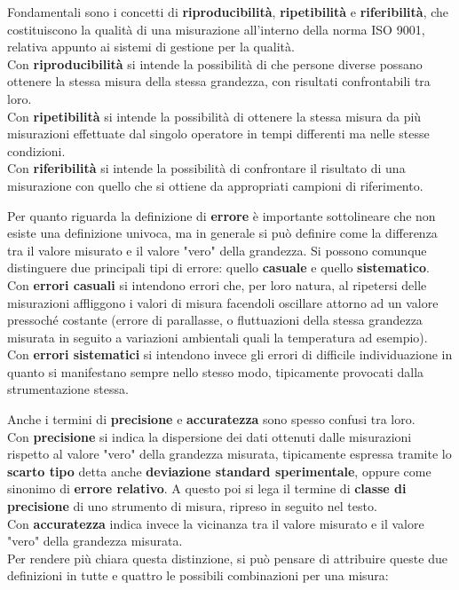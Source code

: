 \documentclass[a4paper, twoside]{article}
\begin{document}
Fondamentali sono i concetti di \textbf{riproducibilità}, \textbf{ripetibilità} e \textbf{riferibilità}, che costituiscono la qualità di una misurazione all'interno della norma ISO 9001, relativa appunto ai sistemi di gestione per la qualità.\\
Con \textbf{riproducibilità} si intende la possibilità di che persone diverse possano ottenere la stessa misura della stessa grandezza, con risultati confrontabili tra loro.\\
Con \textbf{ripetibilità} si intende la possibilità di ottenere la stessa misura da più misurazioni effettuate dal singolo operatore in tempi differenti ma nelle stesse condizioni.\\
Con \textbf{riferibilità} si intende la possibilità di confrontare il risultato di una misurazione con quello che si ottiene da appropriati campioni di riferimento.\par 

Per quanto riguarda la definizione di \textbf{errore} è importante sottolineare che non esiste una definizione univoca, ma in generale si può definire come la differenza tra il valore misurato e il valore "vero" della grandezza. Si possono comunque distinguere due principali tipi di errore: quello \textbf{casuale} e quello \textbf{sistematico}.\\
Con \textbf{errori casuali} si intendono errori che, per loro natura, al ripetersi delle misurazioni affliggono i valori di misura facendoli oscillare attorno ad un valore pressoché costante (errore di parallasse, o fluttuazioni della stessa grandezza misurata in seguito a variazioni ambientali quali la temperatura ad esempio).\\
Con \textbf{errori sistematici} si intendono invece gli errori di difficile individuazione in quanto si manifestano sempre nello stesso modo, tipicamente provocati dalla strumentazione stessa. \par

Anche i termini di \textbf{precisione} e \textbf{accuratezza} sono spesso confusi tra loro.\\
Con \textbf{precisione} si indica la dispersione dei dati ottenuti dalle misurazioni rispetto al valore "vero" della grandezza misurata, tipicamente espressa tramite  lo \textbf{scarto tipo} detta anche \textbf{deviazione standard sperimentale}, oppure come sinonimo di \textbf{errore relativo}. A questo poi si lega il termine di \textbf{classe di precisione} di uno strumento di misura, ripreso in seguito nel testo.\\
Con \textbf{accuratezza} indica invece la vicinanza tra il valore misurato e il valore "vero" della grandezza misurata.\\
Per rendere più chiara questa distinzione, si può pensare di attribuire queste due definizioni in tutte e quattro le possibili combinazioni per una misura:
\end{document}
